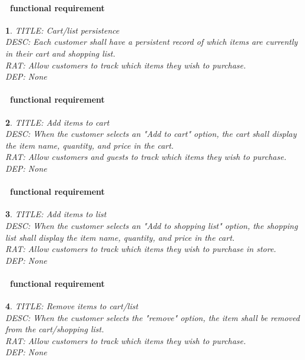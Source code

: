 \documentclass{scrreprt}
\theoremstyle{funreq}
\newtheorem{funreq}{}
\begin{document}
	\paragraph[]{\Subsectionname ~functional requirement }
	\begin{funreq}
		\label{cart_persist}
		TITLE: Cart/list persistence\\
		DESC: Each customer shall have a persistent record of which items are currently in their cart and shopping list.\\
		RAT: Allow customers to track which items they wish to purchase.\\
		DEP: None
	\end{funreq}
	
	\paragraph[]{\Subsectionname ~functional requirement }
	\begin{funreq}
		\label{cart_add}
		TITLE: Add items to cart\\
		DESC: When the customer selects an "Add to cart" option, the cart shall display the item name, quantity, and price in the cart.\\
		RAT: Allow customers and guests to track which items they wish to purchase.\\
		DEP: None
	\end{funreq}

	\paragraph[]{\Subsectionname ~functional requirement }
\begin{funreq}
	\label{list_add}
	TITLE: Add items to list\\
	DESC: When the customer selects an "Add to shopping list" option, the shopping list shall display the item name, quantity, and price in the cart.\\
	RAT: Allow customers to track which items they wish to purchase in store.\\
	DEP: None
\end{funreq}

	\paragraph[]{\Subsectionname ~functional requirement }
	\begin{funreq}
		\label{cart_remove}
		TITLE: Remove items to cart/list\\
		DESC: When the customer selects the "remove" option, the item shall be removed from the cart/shopping list.\\
		RAT: Allow customers to track which items they wish to purchase.\\
		DEP: None
	\end{funreq}
\end{document}
